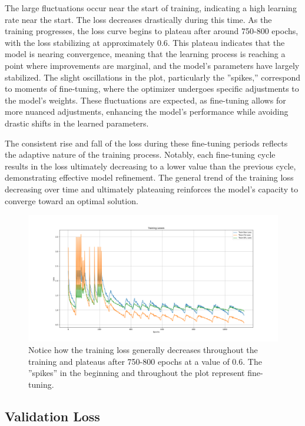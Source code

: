 \documentclass[conference]{IEEEtran}
\begin{document}
The large fluctuations occur near the start of training, 
indicating a high learning rate near the start. 
The loss decreases drastically during this time. 
As the training progresses, 
the loss curve begins to plateau after around 750-800 epochs, 
with the loss stabilizing at approximately 0.6. 
This plateau indicates that the model is nearing convergence, 
meaning that the learning process is reaching a point where improvements are marginal, 
and the model's parameters have largely stabilized. 
The slight oscillations in the plot, 
particularly the ''spikes,'' 
correspond to moments of fine-tuning, 
where the optimizer undergoes specific adjustments to the model's weights. 
These fluctuations are expected, 
as fine-tuning allows for more nuanced adjustments, 
enhancing the model’s performance while avoiding drastic shifts in the learned parameters.

The consistent rise and fall of the loss during these fine-tuning periods reflects the adaptive nature of the training process. 
Notably, 
each fine-tuning cycle results in the loss ultimately decreasing to a lower value than the previous cycle, 
demonstrating effective model refinement. 
The general trend of the training loss decreasing over time and ultimately plateauing reinforces the model's capacity to converge toward an optimal solution.

\begin{figure}[h]
    \centering
    \includegraphics[scale=0.2]{Figure_1.png}
    \caption{
        Notice how the training loss generally decreases throughout the training and plateaus after 750-800 epochs at a value of 0.6. 
        The ''spikes'' in the beginning and throughout the plot represent fine-tuning.
    }
    \label{fig:fig1}
\end{figure}

\subsection{Validation Loss}
\end{document}
